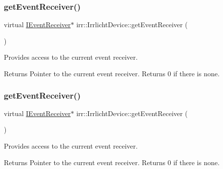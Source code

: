 \subsubsection{\texorpdfstring{get\+Event\+Receiver()}{getEventReceiver()}\hspace{0.1cm}{\footnotesize\ttfamily [1/3]}}
{\footnotesize\ttfamily virtual \hyperlink{classirr_1_1IEventReceiver}{I\+Event\+Receiver}$\ast$ irr\+::\+Irrlicht\+Device\+::get\+Event\+Receiver (\begin{DoxyParamCaption}{ }\end{DoxyParamCaption})\hspace{0.3cm}{\ttfamily [pure virtual]}}



Provides access to the current event receiver. 

\begin{DoxyReturn}{Returns}
Pointer to the current event receiver. Returns 0 if there is none. 
\end{DoxyReturn}
\mbox{\label{classirr_1_1IrrlichtDevice_a26227e20e46915942d067532c61df42b}} 
\subsubsection{\texorpdfstring{get\+Event\+Receiver()}{getEventReceiver()}\hspace{0.1cm}{\footnotesize\ttfamily [2/3]}}
{\footnotesize\ttfamily virtual \hyperlink{classirr_1_1IEventReceiver}{I\+Event\+Receiver}$\ast$ irr\+::\+Irrlicht\+Device\+::get\+Event\+Receiver (\begin{DoxyParamCaption}{ }\end{DoxyParamCaption})\hspace{0.3cm}{\ttfamily [pure virtual]}}



Provides access to the current event receiver. 

\begin{DoxyReturn}{Returns}
Pointer to the current event receiver. Returns 0 if there is none. 
\end{DoxyReturn}
\mbox{\label{classirr_1_1IrrlichtDevice_a26227e20e46915942d067532c61df42b}} 
